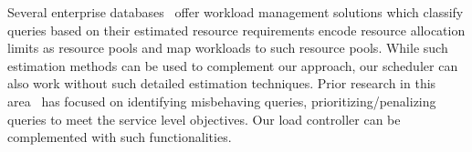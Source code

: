 
Several enterprise databases~\cite{res_gov, rm, DB2, teradatawm, gpdb, hpwm} offer
workload management solutions which %
classify queries based on their estimated resource requirements %
encode resource allocation limits as resource pools and map workloads to such resource pools. 
While such estimation methods can be used to complement our approach, 
our scheduler can also work without such detailed estimation techniques. 
Prior research in this area~\cite{krompass2007dynamic, krompass2006quality} has focused on identifying misbehaving queries, prioritizing/penalizing queries to meet the service level objectives.
Our load controller can be complemented with such functionalities.


